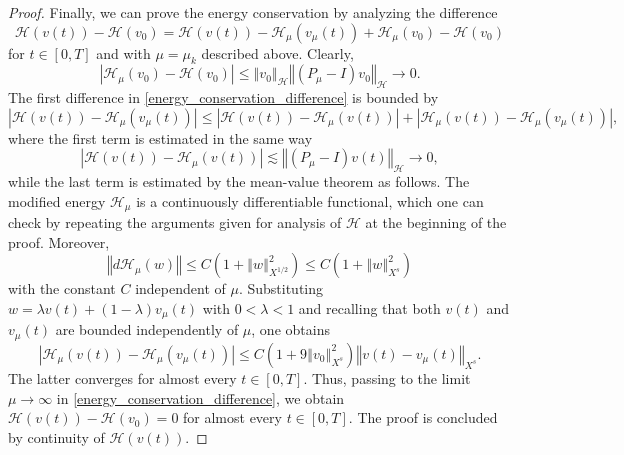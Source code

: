 \documentclass[10pt,a4paper]{amsart}
\newcommand{\Abs}[1]{\left\vert #1 \right\vert}
\newcommand{\norm}[1]{\left\Vert #1 \right\Vert}
\begin{document}
\begin{proof}
Finally, we can prove the energy conservation
by analyzing the difference
%
\begin{equation}
\label{energy_conservation_difference}
    \mathcal H(v(t))
    -
    \mathcal H(v_0)
    =
    \mathcal H(v(t))
    -
    \mathcal H_{\mu}(v_{\mu}(t))
    +
    \mathcal H_{\mu}(v_0)
    -
    \mathcal H(v_0)
\end{equation}
%
for $t \in [0, T]$ and with $\mu = \mu_k$ described above.
Clearly,
\[
    \Abs{
        \mathcal H_{\mu}(v_0)
        -
        \mathcal H(v_0)
    }
    \leqslant
    \norm{v_0}_{\mathcal H}
    \norm{( P_{\mu} - I )v_0}_{\mathcal H}
    \to
    0
    .
\]
The first difference in \eqref{energy_conservation_difference}
is bounded by
\[
    \Abs{
        \mathcal H(v(t))
        -
        \mathcal H_{\mu}(v_{\mu}(t))
    }
    \leqslant
    \Abs{
        \mathcal H(v(t))
        -
        \mathcal H_{\mu}(v(t))
    }
    +
    \Abs{
        \mathcal H_{\mu}(v(t))
        -
        \mathcal H_{\mu}(v_{\mu}(t))
    }
    ,
\]
where the first term is estimated in the same way
\[
    \Abs{
        \mathcal H(v(t))
        -
        \mathcal H_{\mu}(v(t))
    }
    \lesssim
    \norm{( P_{\mu} - I )v(t)}_{\mathcal H}
    \to
    0
    ,
\]
while the last term is estimated by the mean-value theorem as follows.
The modified energy $\mathcal H_{\mu}$ is a continuously differentiable functional,
which one can check by repeating the arguments given
for analysis of $\mathcal H$ at the beginning of the proof.
Moreover,
\[
    \norm{d \mathcal H_{\mu}(w)}
    \leqslant
    C
    \left(
        1 + \norm{w}_{X^{1/2}}^2
    \right)
    \leqslant
    C
    \left(
        1 + \norm{w}_{X^s}^2
    \right)
\]
%
with the constant $C$ independent of $\mu$.
Substituting $w = \lambda v(t) + (1 - \lambda) v_{\mu}(t)$
with $0 < \lambda < 1$
and recalling that both $v(t)$ and $v_{\mu}(t)$ are bounded independently of $\mu$,
one obtains
\[
    \Abs{
        \mathcal H_{\mu}(v(t))
        -
        \mathcal H_{\mu}(v_{\mu}(t))
    }
    \leqslant
    C
    \left(
        1 + 9 \norm{v_0}_{X^s}^2
    \right)
    \norm{
        v(t)
        -
        v_{\mu}(t)
    }_{X^s}
    .
\]
%
The latter converges for almost every $t \in [0, T]$.
Thus, passing to the limit $\mu \to \infty$ in \eqref{energy_conservation_difference},
we obtain
\(
    \mathcal H(v(t))
    -
    \mathcal H(v_0)
    =
    0
\)
for almost every $t \in [0, T]$.
The proof is concluded
by continuity of
\(
    \mathcal H(v(t))
    .
\)
%
\end{proof}
\end{document}
